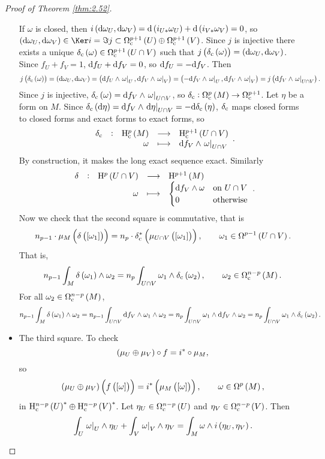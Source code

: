 \begin{proof}[Proof of Theorem \ref{thm:2.52}]
\begin{itemize}
If $ \omega $ is closed, then $ i\br{\d\omega_U, \d\omega_V} = \d\br{i_{U*}\omega_U} + \d\br{i_{V*}\omega_V} = 0 $, so $ \br{\d\omega_U, \d\omega_V} \in \Ker i = \Im j \subset \Omega_\c^{p + 1}\br{U} \oplus \Omega_\c^{p + 1}\br{V} $. Since $ j $ is injective there exists a unique $ \delta_\c\br{\omega} \in \Omega_\c^{p + 1}\br{U \cap V} $ such that $ j\br{\delta_\c\br{\omega}} = \br{\d\omega_U, \d\omega_V} $. Since $ f_U + f_V = 1 $, $ \mathrm{d} f_U + \mathrm{d} f_V = 0 $, so $ \mathrm{d} f_U = -\mathrm{d} f_V $. Then
$$ j\br{\delta_\c\br{\omega}} = \br{\d\omega_U, \d\omega_V} = \br{\d f_U \wedge \eval{\omega}_U, \d f_V \wedge \eval{\omega}_V} = \br{-\d f_V \wedge \eval{\omega}_U, \d f_V \wedge \eval{\omega}_V} = j\br{\d f_V \wedge \eval{\omega}_{U \cap V}}. $$
Since $ j $ is injective, $ \delta_\c\br{\omega} = \d f_V \wedge \eval{\omega}_{U \cap V} $, so $ \delta_\c : \Omega_\c^p\br{M} \to \Omega_\c^{p + 1} $. Let $ \eta $ be a form on $ M $. Since $ \delta_\c\br{\d\eta} = \d f_V \wedge \eval{\d \eta}_{U \cap V} = -\d\delta_\c\br{\eta} $, $ \delta_{\mathrm{c}} $ maps closed forms to closed forms and exact forms to exact forms, so
$$ \function[\delta_\c]{\H_\c^p\br{M}}{\H_\c^{p + 1}\br{U \cap V}}{\omega}{\d f_V \wedge \eval{\omega}_{U \cap V}}. $$
By construction, it makes the long exact sequence exact. Similarly
$$ \function[\delta]{\H^p\br{U \cap V}}{\H^{p + 1}\br{M}}{\omega}{
\begin{cases}
\d f_V \wedge \omega & \text{on} \ U \cap V \\
0 & \text{otherwise}
\end{cases}
}.
$$
Now we check that the second square is commutative, that is
$$ n_{p - 1} \cdot \mu_M\br{\delta\br{\sbr{\omega_1}}} = n_p \cdot \delta_\c^*\br{\mu_{U \cap V}\br{\sbr{\omega_1}}}, \qquad \omega_1 \in \Omega^{p - 1}\br{U \cap V}. $$
That is,
$$ n_{p - 1}\int_M \delta\br{\omega_1} \wedge \omega_2 = n_p\int_{U \cap V} \omega_1 \wedge \delta_\c\br{\omega_2}, \qquad \omega_2 \in \Omega_\c^{n - p}\br{M}. $$
For all $ \omega_2 \in \Omega_\c^{n - p}\br{M} $,
$$ n_{p - 1}\int_M \delta\br{\omega_1} \wedge \omega_2 = n_{p - 1}\int_{U \cap V} \d f_V \wedge \omega_1 \wedge \omega_2 = n_p\int_{U \cap V} \omega_1 \wedge \d f_V \wedge \omega_2 = n_p\int_{U \cap V} \omega_1 \wedge \delta_\c\br{\omega_2}. $$
\item The third square. To check
$$ \br{\mu_U \oplus \mu_V} \circ f = i^* \circ \mu_M, $$
so
$$ \br{\mu_U \oplus \mu_V}\br{f\br{\sbr{\omega}}} = i^*\br{\mu_M\br{\sbr{\omega}}}, \qquad \omega \in \Omega^p\br{M}, $$
in $ \H_\c^{n - p}\br{U}^* \oplus \H_\c^{n - p}\br{V}^* $. Let $ \eta_U \in \Omega_\c^{n - p}\br{U} $ and $ \eta_V \in \Omega_\c^{n - p}\br{V} $. Then
$$ \int_U \eval{\omega}_U \wedge \eta_U + \int_V \eval{\omega}_V \wedge \eta_V = \int_M \omega \wedge i\br{\eta_U, \eta_V}. $$
\end{itemize}
\end{proof}

